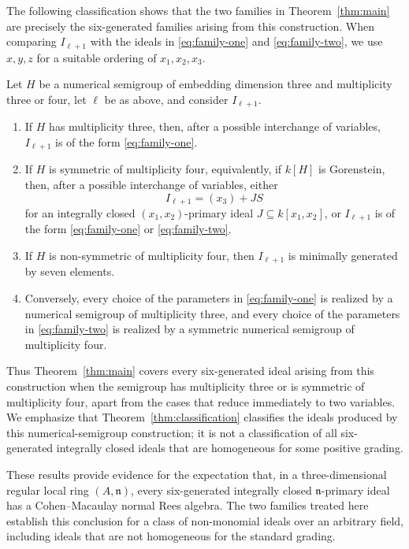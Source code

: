 The following classification shows that the two families in Theorem~\ref{thm:main}
are precisely the six-generated families arising from this construction.
When comparing $I_{\ell+1}$ with the ideals
in \eqref{eq:family-one} and \eqref{eq:family-two}, we use $x,y,z$ for a
suitable ordering of $x_1,x_2,x_3$.

\begin{theoremB}\label{thm:classification}
Let $H$ be a numerical semigroup of embedding dimension three and multiplicity
three or four, let $\ell$ be as above, and consider $I_{\ell+1}$.
\begin{enumerate}[label=\textup{(\arabic*)}]
 \item If $H$ has multiplicity three, then, after a possible interchange of
 variables, $I_{\ell+1}$ is of the form \eqref{eq:family-one}.
 \item If $H$ is symmetric of multiplicity four, equivalently, if $k[H]$ is
 Gorenstein, then, after a possible interchange of variables, either
 \[
  I_{\ell+1}=(x_3)+JS
 \]
 for an integrally closed $(x_1,x_2)$-primary ideal
 $J\subseteq k[x_1,x_2]$, or $I_{\ell+1}$ is of the form
 \eqref{eq:family-one} or \eqref{eq:family-two}.
 \item If $H$ is non-symmetric of multiplicity four, then $I_{\ell+1}$ is
 minimally generated by seven elements.
 \item Conversely, every choice of the parameters in
 \eqref{eq:family-one} is realized by a numerical semigroup of multiplicity
 three, and every choice of the parameters in \eqref{eq:family-two} is
 realized by a symmetric numerical semigroup of multiplicity four.
\end{enumerate}
\end{theoremB}

Thus Theorem~\ref{thm:main} covers every six-generated ideal arising from this construction
when the semigroup has multiplicity three or is symmetric of multiplicity
four, apart from the cases that reduce immediately to two variables.  We
emphasize that Theorem~\ref{thm:classification} classifies the ideals produced by this
numerical-semigroup construction; it is not a classification of all
six-generated integrally closed ideals that are homogeneous for some positive
grading.

These results provide evidence for the expectation that, in a three-dimensional regular local ring $(A,\mathfrak n)$, 
every six-generated integrally closed $\mathfrak n$-primary ideal has a Cohen–Macaulay normal Rees algebra. 
The two families treated here establish this conclusion for a class of non-monomial ideals over an arbitrary field, including ideals that are not homogeneous for the standard grading.

